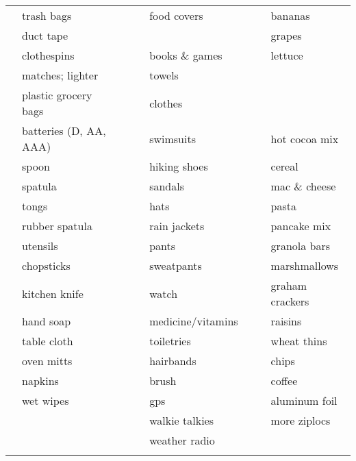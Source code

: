 \documentclass[10pt]{article}
\newcommand{\mybox}{\framebox[4mm]{\textcolor{white} m} \framebox[4mm]{\textcolor{white} m} }
\begin{document}
\begin{tabular}{rlcrlcrl}
\mybox & trash bags             &    &\mybox & food covers          &    &\mybox & bananas \\
\mybox & duct tape              &    &\mybox &                      &    &\mybox & grapes \\ \cline{4-5}
\mybox & clothespins            &    &\mybox & books \& games       &    &\mybox & lettuce \\
\mybox & matches; lighter       &    &\mybox & towels               &    &\mybox & \\
\mybox & plastic grocery bags   &    &\mybox & clothes              &    &\mybox & \\ \cline{7-8}
\mybox & batteries (D, AA, AAA) &    &\mybox & swimsuits            &    &\mybox & hot cocoa mix \\ \cline{1-2}
\mybox & spoon                  &    &\mybox & hiking shoes         &    &\mybox & cereal \\
\mybox & spatula                &    &\mybox & sandals              &    &\mybox & mac \& cheese \\
\mybox & tongs                  &    &\mybox & hats                 &    &\mybox & pasta \\
\mybox & rubber spatula         &    &\mybox & rain jackets         &    &\mybox & pancake mix \\
\mybox & utensils               &    &\mybox & pants                &    &\mybox & granola bars \\
\mybox & chopsticks             &    &\mybox & sweatpants           &    &\mybox & marshmallows \\
\mybox & kitchen knife          &    &\mybox & watch                &    &\mybox & graham crackers \\
\mybox & hand soap              &    &\mybox & medicine/vitamins    &    &\mybox & raisins \\
\mybox & table cloth            &    &\mybox & toiletries           &    &\mybox & wheat thins \\
\mybox & oven mitts             &    &\mybox & hairbands            &    &\mybox & chips \\
\mybox & napkins                &    &\mybox & brush                &    &\mybox & coffee \\ \cline{4-5}
\mybox & wet wipes              &    &\mybox & gps                  &    &\mybox & aluminum foil \\
\mybox &                        &    &\mybox & walkie talkies       &    &\mybox & more ziplocs \\
\mybox &                        &    &\mybox & weather radio        &    &\mybox & \\
\mybox & \hspace{1.5in}         &    &\mybox & \hspace{1.5in}       &    &\mybox & \hspace{1.5in} \\ \hline
\end{tabular}
\end{document}
